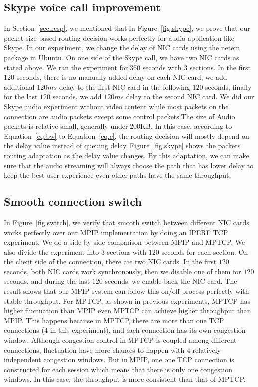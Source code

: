 \subsection{Skype voice call improvement}
\label{sec:skype}

In Section~\ref{sec:resp}, we mentioned that 
In Figure~\ref{fig.skype}, we prove that our packet-size based routing decision works perfectly for audio application like Skype. In our experiment, we change the delay of NIC cards using the netem package in Ubuntu. On one side of the Skype call, we have two NIC cards as stated above. We ran the experiment for $360$ seconds with $3$ sections. In the first $120$ seconds, there is no manually added delay on each NIC card, we add additional $120ms$ delay to the first NIC card in the following $120$ seconds, finally for the last $120$ seconds, we add $120ms$ delay to the second NIC card. We did our Skype audio experiment without video content while most packets on the connection are audio packets except some control packets.The size of Audio packets is relative small, generally under $200$KB. In this case, according to Equation~\ref{eq.bw} to Equation~\ref{eq.c}, the routing decision will mostly depend on the delay value instead of queuing delay. Figure~\ref{fig.skype} shows the packets routing adaptation as the delay value changes. By this adaptation, we can make sure that the audio streaming will always choose the path that has lower delay to keep the best user experience even other paths have the same throughput.


\subsection{Smooth connection switch}
\label{sec:switch}

In Figure~\ref{fig.switch}, we verify that smooth switch between different NIC cards works perfectly over our MPIP implementation by doing an IPERF TCP experiment. We do a side-by-side comparison between MPIP and MPTCP. We also divide the experiment into $3$ sections with $120$ seconds for each section. On the client side of the connection, there are two NIC cards. In the first $120$ seconds, both NIC cards work synchronously, then we disable one of them for $120$ seconds, and during the last $120$ seconds, we enable back the NIC card. The result shows that our MPIP system can follow this on/off process perfectly with stable throughput. For MPTCP, as shown in previous experiments, MPTCP has higher fluctuation than MPIP even MPTCP can achieve higher throughput than MPIP. This happens because in MPTCP, there are more than one TCP connections ($4$ in this experiment), and each connection has its own congestion window. Although congestion control in MPTCP is coupled among different connections, fluctuation have more chances to happen with $4$ relatively independent congestion windows. But in MPIP, one one TCP connection is constructed for each session which means that there is only one congestion windows. In this case, the throughput is more consistent than that of MPTCP.